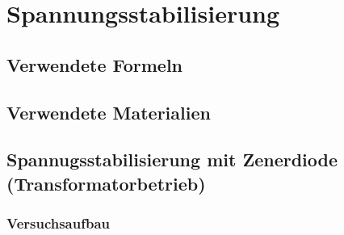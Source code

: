 \documentclass[12pt,a4paper]{article}
\begin{document}
\section{Spannungsstabilisierung}
\subsection{Verwendete Formeln}
\subsection{Verwendete Materialien}
\subsection{Spannugsstabilisierung mit Zenerdiode (Transformatorbetrieb)}
\subsubsection{Versuchsaufbau}
\end{document}
